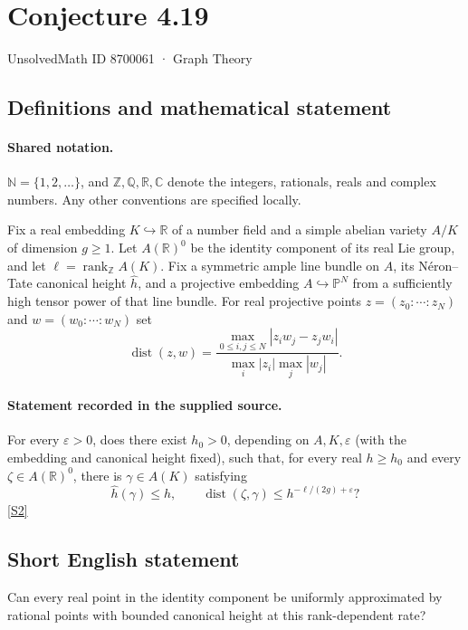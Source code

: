 \documentclass[11pt]{article}
\newcommand{\sref}[2]{\hyperlink{source:#1:#2}{[S#2]}}
\begin{document}
\setcounter{section}{8700060}
\section{Conjecture 4.19}\label{8700061}
{\small\sffamily UnsolvedMath ID 8700061 · Graph Theory}
\subsection{Definitions and mathematical statement}

\paragraph{Shared notation.}$\mathbb N=\{1,2,\ldots\}$, and $\mathbb Z,\mathbb Q,\mathbb R,\mathbb C$ denote the integers, rationals, reals and complex numbers. Any other conventions are specified locally.


Fix a real embedding $K\hookrightarrow\mathbb R$ of a number field and a simple abelian variety $A/K$ of dimension $g\ge1$. Let $A(\mathbb R)^0$ be the identity component of its real Lie group, and let $\ell=\operatorname{rank}_{\mathbb Z}A(K)$. Fix a symmetric ample line bundle on $A$, its Néron--Tate canonical height $\widehat h$, and a projective embedding $A\hookrightarrow\mathbb P^N$ from a sufficiently high tensor power of that line bundle. For real projective points $z=(z_0:\cdots:z_N)$ and $w=(w_0:\cdots:w_N)$ set
\[
\operatorname{dist}(z,w)=\frac{\max_{0\le i,j\le N}|z_iw_j-z_jw_i|}{\max_i|z_i|\max_j|w_j|}.
\]
\paragraph{Statement recorded in the supplied source.}
For every $\varepsilon>0$, does there exist $h_0>0$, depending on $A,K,\varepsilon$ (with the embedding and canonical height fixed), such that, for every real $h\ge h_0$ and every $\zeta\in A(\mathbb R)^0$, there is $\gamma\in A(K)$ satisfying
\[
\widehat h(\gamma)\le h,\qquad \operatorname{dist}(\zeta,\gamma)\le h^{-\ell/(2g)+\varepsilon}?
\] \sref{8700061}{2}

\subsection{Short English statement}
Can every real point in the identity component be uniformly approximated by rational points with bounded canonical height at this rank-dependent rate?
\end{document}
